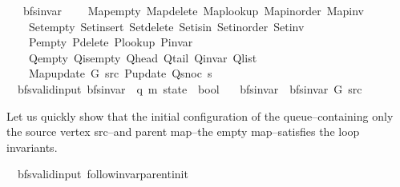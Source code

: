 \begin{isabellebody}
\ \ \ bfs{\isacharunderscore}{\kern0pt}invar\isanewline
\ \ \ \ Map{\isacharunderscore}{\kern0pt}empty\ Map{\isacharunderscore}{\kern0pt}delete\ Map{\isacharunderscore}{\kern0pt}lookup\ Map{\isacharunderscore}{\kern0pt}inorder\ Map{\isacharunderscore}{\kern0pt}inv\isanewline
\ \ \ \ Set{\isacharunderscore}{\kern0pt}empty\ Set{\isacharunderscore}{\kern0pt}insert\ Set{\isacharunderscore}{\kern0pt}delete\ Set{\isacharunderscore}{\kern0pt}isin\ Set{\isacharunderscore}{\kern0pt}inorder\ Set{\isacharunderscore}{\kern0pt}inv\isanewline
\ \ \ \ P{\isacharunderscore}{\kern0pt}empty\ P{\isacharunderscore}{\kern0pt}delete\ P{\isacharunderscore}{\kern0pt}lookup\ P{\isacharunderscore}{\kern0pt}invar\isanewline
\ \ \ \ Q{\isacharunderscore}{\kern0pt}empty\ Q{\isacharunderscore}{\kern0pt}is{\isacharunderscore}{\kern0pt}empty\ Q{\isacharunderscore}{\kern0pt}head\ Q{\isacharunderscore}{\kern0pt}tail\ Q{\isacharunderscore}{\kern0pt}invar\ Q{\isacharunderscore}{\kern0pt}list\isanewline
\ \ \ \ Map{\isacharunderscore}{\kern0pt}update\ G\ src\ P{\isacharunderscore}{\kern0pt}update\ Q{\isacharunderscore}{\kern0pt}snoc\ s{\isachardoublequoteclose}\isanewline
\isanewline
{}\isamarkupfalse%
\ {\isacharparenleft}{\kern0pt}\ bfs{\isacharunderscore}{\kern0pt}valid{\isacharunderscore}{\kern0pt}input{\isacharparenright}{\kern0pt}\ bfs{\isacharunderscore}{\kern0pt}invar{\isacharprime}{\kern0pt}{\isacharprime}{\kern0pt}\ {\isacharcolon}{\kern0pt}{\isacharcolon}{\kern0pt}\ {\isachardoublequoteopen}{\isacharparenleft}{\kern0pt}{\isacharprime}{\kern0pt}q{\isacharcomma}{\kern0pt}\ {\isacharprime}{\kern0pt}m{\isacharparenright}{\kern0pt}\ state\ {\isasymRightarrow}\ bool{\isachardoublequoteclose}\ \isanewline
\ \ {\isachardoublequoteopen}bfs{\isacharunderscore}{\kern0pt}invar{\isacharprime}{\kern0pt}{\isacharprime}{\kern0pt}\ {\isasymequiv}\ bfs{\isacharunderscore}{\kern0pt}invar{\isacharprime}{\kern0pt}\ G\ src{\isachardoublequoteclose}%
\begin{isamarkuptext}%
Let us quickly show that the initial configuration of the queue--containing only the source vertex
src--and parent map--the empty map--satisfies the loop invariants.%
\end{isamarkuptext}\isamarkuptrue%
\isamarkupfalse%
\ {\isacharparenleft}{\kern0pt}\ bfs{\isacharunderscore}{\kern0pt}valid{\isacharunderscore}{\kern0pt}input{\isacharparenright}{\kern0pt}\ follow{\isacharunderscore}{\kern0pt}invar{\isacharunderscore}{\kern0pt}parent{\isacharunderscore}{\kern0pt}init{\isacharcolon}{\kern0pt}\isanewline

\end{isabellebody}
